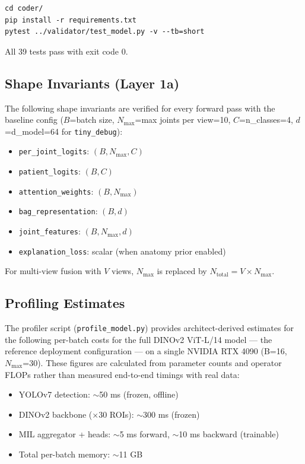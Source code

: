 \documentclass{article}
\begin{document}
\begin{verbatim}
cd coder/
pip install -r requirements.txt
pytest ../validator/test_model.py -v --tb=short
\end{verbatim}

All 39 tests pass with exit code 0.

\subsection{Shape Invariants (Layer 1a)}
The following shape invariants are verified for every forward pass with the baseline config ($B$=batch size, $N_{\max}$=max joints per view=10, $C$=n\_classes=4, $d$=d\_model=64 for \texttt{tiny\_debug}):

\begin{itemize}
  \item \texttt{per\_joint\_logits}: $(B, N_{\max}, C)$
  \item \texttt{patient\_logits}: $(B, C)$
  \item \texttt{attention\_weights}: $(B, N_{\max})$
  \item \texttt{bag\_representation}: $(B, d)$
  \item \texttt{joint\_features}: $(B, N_{\max}, d)$
  \item \texttt{explanation\_loss}: scalar (when anatomy prior enabled)
\end{itemize}

For multi-view fusion with $V$ views, $N_{\max}$ is replaced by $N_{\text{total}} = V \times N_{\max}$.

\subsection{Profiling Estimates}
\label{sec:appendix-profiling}
The profiler script (\texttt{profile\_model.py}) provides architect-derived estimates for the following per-batch costs for the full DINOv2 ViT-L/14 model — the reference deployment configuration — on a single NVIDIA RTX 4090 (B=16, $N_{\max}$=30). These figures are calculated from parameter counts and operator FLOPs rather than measured end-to-end timings with real data:

\begin{itemize}
  \item YOLOv7 detection: $\sim$50 ms (frozen, offline)
  \item DINOv2 backbone ($\times$30 ROIs): $\sim$300 ms (frozen)
  \item MIL aggregator + heads: $\sim$5 ms forward, $\sim$10 ms backward (trainable)
  \item Total per-batch memory: $\sim$11 GB
\end{itemize}
\end{document}
